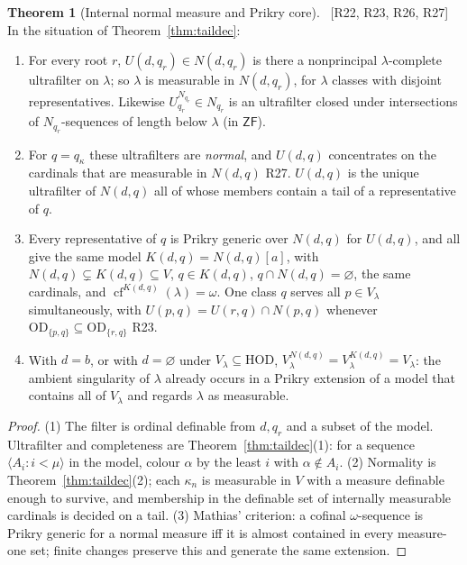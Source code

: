 \documentclass[11pt,letterpaper]{article}
\theoremstyle{definition}
\newtheorem{theorem}[definition]{Theorem}
\numberwithin{equation}{section}
\newcommand{\ZF}{\mathsf{ZF}}
\newcommand{\HOD}{\mathrm{HOD}}
\newcommand{\OD}{\mathrm{OD}}
\newcommand{\cf}{\operatorname{cf}}
\newcommand{\src}[1]{\unskip\ {\normalfont\small\sffamily\color{Olive}[#1]}\ }
\newcommand{\R}[1]{\textsf{R#1}}
\begin{document}
\begin{theorem}[Internal normal measure and Prikry core]\label{thm:core}\src{R22, R23, R26, R27}
In the situation of Theorem~\ref{thm:taildec}:
\begin{enumerate}
\item For every root $r$, $U(d,q_r)\in N(d,q_r)$ is there a nonprincipal $\lambda$-complete ultrafilter on $\lambda$; so $\lambda$ is measurable in $N(d,q_r)$, for $\lambda$ classes with disjoint representatives. Likewise $U^{N_{q_r}}_{q_r}\in N_{q_r}$ is an ultrafilter closed under intersections of $N_{q_r}$-sequences of length below $\lambda$ (in $\ZF$).
\item For $q=q_\kappa$ these ultrafilters are \emph{normal}, and $U(d,q)$ concentrates on the cardinals that are measurable in $N(d,q)$ \R{27}. $U(d,q)$ is the unique ultrafilter of $N(d,q)$ all of whose members contain a tail of a representative of $q$.
\item Every representative of $q$ is Prikry generic over $N(d,q)$ for $U(d,q)$, and all give the same model $K(d,q)=N(d,q)[a]$, with $N(d,q)\subsetneq K(d,q)\subseteq V$, $q\in K(d,q)$, $q\cap N(d,q)=\varnothing$, the same cardinals, and $\cf^{K(d,q)}(\lambda)=\omega$. One class $q$ serves all $p\in V_\lambda$ simultaneously, with $U(p,q)=U(r,q)\cap N(p,q)$ whenever $\OD_{\{p,q\}}\subseteq\OD_{\{r,q\}}$ \R{23}.
\item With $d=b$, or with $d=\varnothing$ under $V_\lambda\subseteq\HOD$, $V_\lambda^{N(d,q)}=V_\lambda^{K(d,q)}=V_\lambda$: the ambient singularity of $\lambda$ already occurs in a Prikry extension of a model that contains all of $V_\lambda$ and regards $\lambda$ as measurable.
\end{enumerate}
\end{theorem}

\begin{proof}
(1) The filter is ordinal definable from $d,q_r$ and a subset of the model. Ultrafilter and completeness are Theorem~\ref{thm:taildec}(1): for a sequence $\langle A_i:i<\mu\rangle$ in the model, colour $\alpha$ by the least $i$ with $\alpha\notin A_i$. (2) Normality is Theorem~\ref{thm:taildec}(2); each $\kappa_n$ is measurable in $V$ with a measure definable enough to survive, and membership in the definable set of internally measurable cardinals is decided on a tail. (3) Mathias' criterion: a cofinal $\omega$-sequence is Prikry generic for a normal measure iff it is almost contained in every measure-one set; finite changes preserve this and generate the same extension.
\end{proof}
\end{document}
